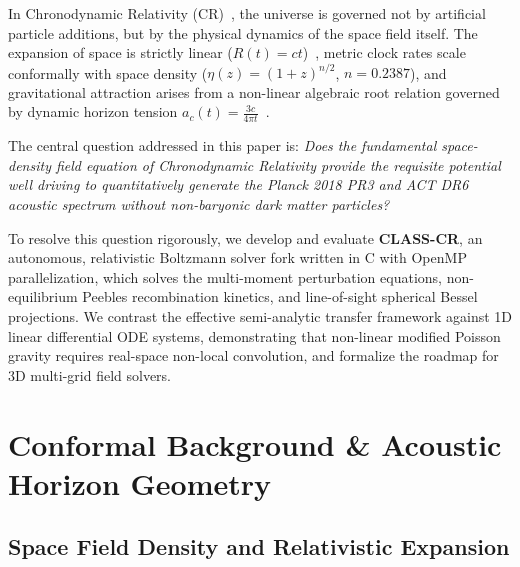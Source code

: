 \documentclass[aps,prd,reprint,superscriptaddress,nofootinbib,twocolumn]{revtex4-2}
\begin{document}
In Chronodynamic Relativity (CR)~\cite{Shreve2026_Foundations}, the universe is governed not by artificial particle additions, but by the physical dynamics of the space field itself. The expansion of space is strictly linear ($R(t) = ct$)~\cite{Shreve2026_Expansion}, metric clock rates scale conformally with space density ($\eta(z) = (1+z)^{n/2}$, $n = 0.2387$), and gravitational attraction arises from a non-linear algebraic root relation governed by dynamic horizon tension $a_c(t) = \frac{3c}{4\pi t}$~\cite{Shreve2026_WideBinaries,Shreve2026_Clusters}. 

The central question addressed in this paper is: \textit{Does the fundamental space-density field equation of Chronodynamic Relativity provide the requisite potential well driving to quantitatively generate the Planck 2018 PR3 and ACT DR6 acoustic spectrum without non-baryonic dark matter particles?}

To resolve this question rigorously, we develop and evaluate \textbf{CLASS-CR}, an autonomous, relativistic Boltzmann solver fork written in C with OpenMP parallelization, which solves the multi-moment perturbation equations, non-equilibrium Peebles recombination kinetics, and line-of-sight spherical Bessel projections. We contrast the effective semi-analytic transfer framework against 1D linear differential ODE systems, demonstrating that non-linear modified Poisson gravity requires real-space non-local convolution, and formalize the roadmap for 3D multi-grid field solvers.

\section{Conformal Background \& Acoustic Horizon Geometry}
\label{sec:background}

\subsection{Space Field Density and Relativistic Expansion}
\end{document}
